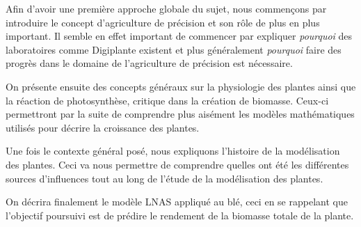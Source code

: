 Afin d'avoir une première approche globale du sujet, 
nous commençons par introduire
le concept d'agriculture de précision et son rôle de plus en plus important.
Il semble en effet important de commencer par expliquer \emph{pourquoi}
des laboratoires comme Digiplante existent et plus généralement \emph{pourquoi}
faire des progrès dans le domaine de l'agriculture de précision est nécessaire.

On présente ensuite des concepts généraux sur la physiologie des plantes
ainsi que la réaction de photosynthèse, critique dans la création
de biomasse.
Ceux-ci permettront par la suite de comprendre plus aisément
les modèles mathématiques utilisés pour décrire la croissance des plantes.

Une fois le contexte général posé, nous expliquons l'histoire de la modélisation 
des plantes. Ceci va nous permettre de comprendre quelles ont été les différentes 
sources d'influences tout au long de l'étude de la modélisation des plantes.

On décrira finalement le modèle LNAS appliqué au blé, ceci en se rappelant que l'objectif poursuivi est de prédire le rendement
de la biomasse totale de la plante.

